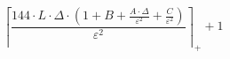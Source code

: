 \[\left\lceil \frac{144 \cdot L \cdot \Delta \cdot \left(1 + B + \frac{A \cdot \Delta}{\varepsilon^{2}} + \frac{C}{\varepsilon^{2}}\right)}{\varepsilon^{2}} \right\rceil_{+} + 1\]
